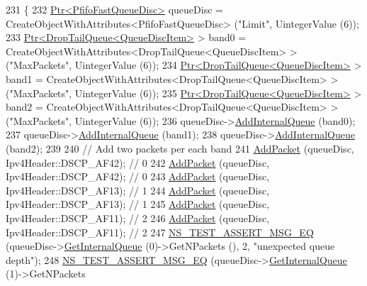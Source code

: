 \begin{DoxyCode}
231 \{
232   \hyperlink{classns3_1_1Ptr}{Ptr<PfifoFastQueueDisc>} queueDisc = CreateObjectWithAttributes<PfifoFastQueueDisc>
       (\textcolor{stringliteral}{"Limit"}, UintegerValue (6));
233   \hyperlink{classns3_1_1Ptr}{Ptr<DropTailQueue<QueueDiscItem>} > band0 = 
      CreateObjectWithAttributes<DropTailQueue<QueueDiscItem> > (\textcolor{stringliteral}{"MaxPackets"}, UintegerValue (6));
234   \hyperlink{classns3_1_1Ptr}{Ptr<DropTailQueue<QueueDiscItem>} > band1 = 
      CreateObjectWithAttributes<DropTailQueue<QueueDiscItem> > (\textcolor{stringliteral}{"MaxPackets"}, UintegerValue (6));
235   \hyperlink{classns3_1_1Ptr}{Ptr<DropTailQueue<QueueDiscItem>} > band2 = 
      CreateObjectWithAttributes<DropTailQueue<QueueDiscItem> > (\textcolor{stringliteral}{"MaxPackets"}, UintegerValue (6));
236   queueDisc->\hyperlink{classns3_1_1QueueDisc_a0599223e2a3976ef042a56c2923a2b61}{AddInternalQueue} (band0);
237   queueDisc->\hyperlink{classns3_1_1QueueDisc_a0599223e2a3976ef042a56c2923a2b61}{AddInternalQueue} (band1);
238   queueDisc->\hyperlink{classns3_1_1QueueDisc_a0599223e2a3976ef042a56c2923a2b61}{AddInternalQueue} (band2);
239 
240   \textcolor{comment}{// Add two packets per each band}
241   \hyperlink{classPfifoFastQueueDiscOverflow_a582831d7aed3c5d5f57d3bd4859a7f89}{AddPacket} (queueDisc, Ipv4Header::DSCP\_AF42); \textcolor{comment}{// 0}
242   \hyperlink{classPfifoFastQueueDiscOverflow_a582831d7aed3c5d5f57d3bd4859a7f89}{AddPacket} (queueDisc, Ipv4Header::DSCP\_AF42); \textcolor{comment}{// 0}
243   \hyperlink{classPfifoFastQueueDiscOverflow_a582831d7aed3c5d5f57d3bd4859a7f89}{AddPacket} (queueDisc, Ipv4Header::DSCP\_AF13); \textcolor{comment}{// 1}
244   \hyperlink{classPfifoFastQueueDiscOverflow_a582831d7aed3c5d5f57d3bd4859a7f89}{AddPacket} (queueDisc, Ipv4Header::DSCP\_AF13); \textcolor{comment}{// 1}
245   \hyperlink{classPfifoFastQueueDiscOverflow_a582831d7aed3c5d5f57d3bd4859a7f89}{AddPacket} (queueDisc, Ipv4Header::DSCP\_AF11); \textcolor{comment}{// 2}
246   \hyperlink{classPfifoFastQueueDiscOverflow_a582831d7aed3c5d5f57d3bd4859a7f89}{AddPacket} (queueDisc, Ipv4Header::DSCP\_AF11); \textcolor{comment}{// 2}
247   \hyperlink{group__testing_ga2a9d78cffb3db8e867c35fff0b698cf5}{NS\_TEST\_ASSERT\_MSG\_EQ} (queueDisc->\hyperlink{classns3_1_1QueueDisc_adf09b498c07c5677c26ea4b8309def74}{GetInternalQueue} (0)->GetNPackets 
      (), 2, \textcolor{stringliteral}{"unexpected queue depth"});
248   \hyperlink{group__testing_ga2a9d78cffb3db8e867c35fff0b698cf5}{NS\_TEST\_ASSERT\_MSG\_EQ} (queueDisc->\hyperlink{classns3_1_1QueueDisc_adf09b498c07c5677c26ea4b8309def74}{GetInternalQueue} (1)->GetNPackets 

\end{DoxyCode}
